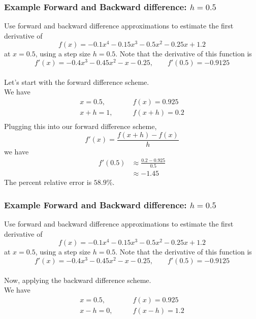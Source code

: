 \documentclass{if-beamer}
\begin{document}
\begin{frame}
\frametitle{Example Forward and Backward difference: $h= 0.5$}
Use forward and backward difference approximations to estimate the first derivative of
$$f(x) = -0.1x^4-0.15x^3-0.5x^2-0.25x+1.2 $$
at $x=0.5$, using a step size $h = 0.5$. Note that the derivative of this function is
$$f'(x) = -0.4x^3-0.45x^2-x-0.25, \qquad f'(0.5) = -0.9125$$
\\\vspace{5pt}
Let's start with the forward difference scheme.\\\vspace{5pt}
We have
\begin{align*}
x = 0.5, \qquad &f(x) = 0.925\\
x+h = 1, \qquad &f(x+h) = 0.2\\
\end{align*}
Plugging this into our forward difference scheme, 
$$f'(x) = \frac{f(x+h)-f(x)}{h} $$
we have
\begin{align*}
f'(0.5) &\approx \frac{0.2-0.925}{0.5} \\
&\approx -1.45
\end{align*}
The percent relative error is $58.9\%$.
\end{frame}


\begin{frame}
\frametitle{Example Forward and Backward difference: $h= 0.5$}
Use forward and backward difference approximations to estimate the first derivative of
$$f(x) = -0.1x^4-0.15x^3-0.5x^2-0.25x+1.2 $$
at $x=0.5$, using a step size $h = 0.5$. Note that the derivative of this function is
$$f'(x) = -0.4x^3-0.45x^2-x-0.25, \qquad f'(0.5) = -0.9125$$
\\\vspace{5pt}
Now, applying the backward difference scheme.\\\vspace{5pt}
We have
\begin{align*}
x = 0.5, \qquad &f(x) = 0.925\\
x-h = 0, \qquad &f(x-h) = 1.2\\
\end{align*}
\end{frame}
\end{document}
